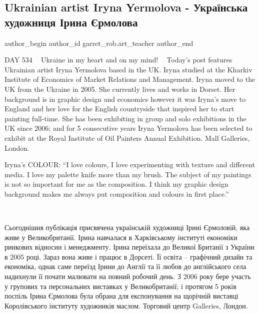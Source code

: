  
 
 
 
 

\subsection{Ukrainian artist Iryna Yermolova - Українська художниця Ірина Єрмолова}
\label{sec:11_08_2023.fb.garret_rob.art_teacher.1.ukrainian_artist_iryna_yermolova}

\ifcmt
 author_begin
   author_id garret_rob.art_teacher
 author_end
\fi

DAY 534 💙💛 Ukraine in my heart and on my mind! 💙💛 Today's post features
Ukrainian artist Iryna Yermolova based in the UK. Iryna studied at the Kharkiv
Institute of Economics of Market Relations and Management. Iryna moved to the
UK from the Ukraine in 2005. She currently lives and works in Dorset. Her
background is in graphic design and economics however it was Iryna’s move to
England and her love for the English countryside that inspired her to start
painting full-time. She has been exhibiting in group and solo exhibitions in
the UK since 2006; and for 5 consecutive years Iryna Yermolova has been
selected to exhibit at the Royal Institute of Oil Painters Annual Exhibition.
Mall Galleries, London.

Iryna's COLOUR: \enquote{I love colours, I love experimenting with texture and
different media. I love my palette knife more than my brush. The subject of my
paintings is not so important for me as the composition. I think my graphic
design background makes me always put composition and colours in first place.} 

💙💛 💙💛 💙💛 💙💛 💙💛

Сьогоднішня публікація присвячена українській художниці Ірині Єрмоловій, яка
живе у Великобританії. Ірина навчалася в Харківському інституті економіки
ринкових відносин і менеджменту. Ірина переїхала до Великої Британії з України
в 2005 році. Зараз вона живе і працює в Дорсеті. Її освіта – графічний дизайн
та економіка, однак саме переїзд Ірини до Англії та її любов до англійського
села надихнули її почати малювати на повний робочий день. З 2006 року бере
участь у групових та персональних виставках у Великобританії; і протягом 5
років поспіль Ірина Єрмолова була обрана для експонування на щорічній виставці
Королівського інституту художників маслом. Торговий центр Galleries, Лондон.

